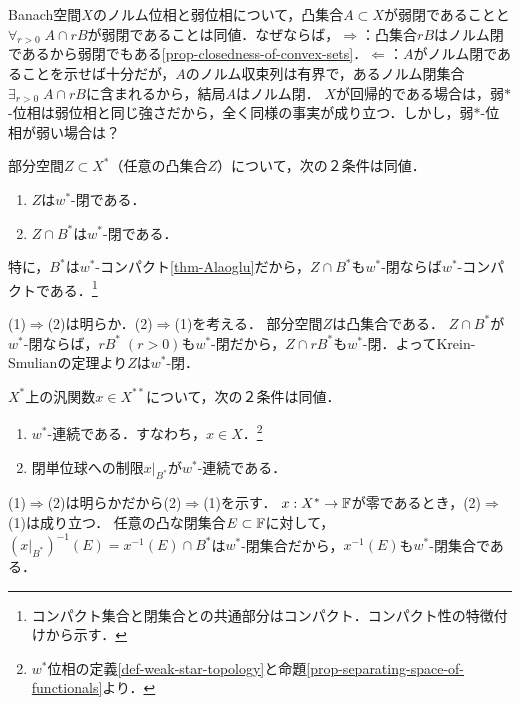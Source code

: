 \documentclass[uplatex,dvipdfmx]{jsreport}
\begin{document}
\begin{remarks}
    Banach空間$X$のノルム位相と弱位相について，凸集合$A\subset X$が弱閉であることと$\forall_{r>0}\;A\cap rB$が弱閉であることは同値．なぜならば，$\Rightarrow$：凸集合$rB$はノルム閉であるから弱閉でもある\ref{prop-closedness-of-convex-sets}．$\Leftarrow$：$A$がノルム閉であることを示せば十分だが，$A$のノルム収束列は有界で，あるノルム閉集合$\exists_{r>0}\;A\cap rB$に含まれるから，結局$A$はノルム閉．
    $X$が回帰的である場合は，弱$*$-位相は弱位相と同じ強さだから，全く同様の事実が成り立つ．しかし，弱$*$-位相が弱い場合は？
\end{remarks}

\begin{corollary}
    部分空間$Z\subset X^*$（任意の凸集合$Z$）について，次の２条件は同値．
    \begin{enumerate}
        \item $Z$は$w^*$-閉である．
        \item $Z\cap B^*$は$w^*$-閉である．
    \end{enumerate}
    特に，$B^*$は$w^*$-コンパクト\ref{thm-Alaoglu}だから，$Z\cap B^*$も$w^*$-閉ならば$w^*$-コンパクトである．\footnote{コンパクト集合と閉集合との共通部分はコンパクト．コンパクト性の特徴付けから示す．}
\end{corollary}
\begin{Proof}
    (1)$\Rightarrow$(2)は明らか．(2)$\Rightarrow$(1)を考える．
    部分空間$Z$は凸集合である．
    $Z\cap B^*$が$w^*$-閉ならば，$rB^*\;(r>0)$も$w^*$-閉だから，$Z\cap rB^*$も$w^*$-閉．よってKrein-Smulianの定理より$Z$は$w^*$-閉．
\end{Proof}

\begin{corollary}\label{cor-characterization-of-weak-star-continuousness}
    $X^*$上の汎関数$x\in X^{**}$について，次の２条件は同値．
    \begin{enumerate}
        \item $w^*$-連続である．すなわち，$x\in X$．\footnote{$w^*$位相の定義\ref{def-weak-star-topology}と命題\ref{prop-separating-space-of-functionals}より．}
        \item 閉単位球への制限$x|_{B^*}$が$w^*$-連続である．
    \end{enumerate}
\end{corollary}
\begin{Proof}
    (1)$\Rightarrow$(2)は明らかだから(2)$\Rightarrow$(1)を示す．
    $x:X^*\to\mathbb{F}$が零であるとき，(2)$\Rightarrow$(1)は成り立つ．
    任意の凸な閉集合$E\subset\mathbb{F}$に対して，$(x|_{B^*})^{-1}(E)=x^{-1}(E)\cap B^*$は$w^*$-閉集合だから，$x^{-1}(E)$も$w^*$-閉集合である．
\end{Proof}
\end{document}
